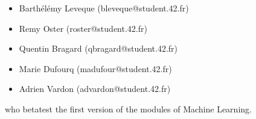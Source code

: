 \documentclass{42-en}
\begin{document}
\begin{itemize}
    \item Barthélémy Leveque (bleveque@student.42.fr)
    \item Remy Oster (roster@student.42.fr)
    \item Quentin Bragard (qbragard@student.42.fr)
    \item Marie Dufourq (madufour@student.42.fr)
    \item Adrien Vardon (advardon@student.42.fr)
\end{itemize}
who betatest the first version of the modules of Machine Learning.
\vfill
\doclicenseThis
\end{document}
